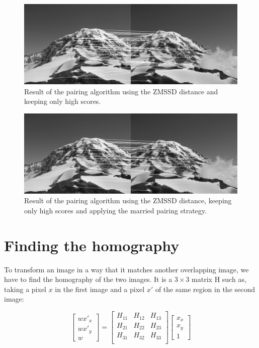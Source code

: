\documentclass[a4paper,twocolumn]{article}
\begin{document}
\begin{figure}[h!]
\centering\includegraphics[width=\textwidth]{images/pairs_zmssd_highscore.png}
\caption{Result of the pairing algorithm using the ZMSSD distance and keeping only high scores.}
\label{pairs_zmssd_highscore}
\end{figure}

\begin{figure}[h!]
\centering\includegraphics[width=\textwidth]{images/pairs_zmssd_highscore_reciprocity.png}
\caption{Result of the pairing algorithm using the ZMSSD distance, keeping only high scores and applying the married pairing strategy.}
\label{pairs_zmssd_highscore_reciprocity}
\vspace{1cm}
\end{figure}

\section{Finding the homography}

To transform an image in a way that it matches another overlapping image, we have to find the homography of the two images. It is a $3 \times 3$ matrix H such as, taking a pixel $x$ in the first image and a pixel $x'$ of the same region in the second image:

$$
\begin{bmatrix}
w x'_x \\
w x'_y \\
w
\end{bmatrix}
=
\begin{bmatrix}
H_{11} & H_{12} & H_{13} \\
H_{21} & H_{22} & H_{23} \\
H_{31} & H_{32} & H_{33} \\
\end{bmatrix}
\begin{bmatrix}
x_x \\
x_y \\
1
\end{bmatrix}
$$
\end{document}
